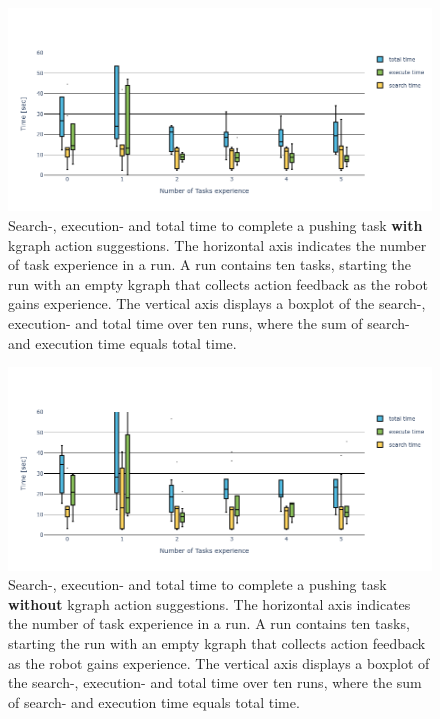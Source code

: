 \begin{figure}[H]
    \centering
    \includegraphics[width=\textwidth]{figures/results/random_push_time_kgraph}
    \caption{Search-, execution- and total time to complete a pushing task \textbf{with} \ac{kgraph} action suggestions. The horizontal axis indicates the number of task experience in a run. A run contains ten tasks, starting the run with an empty \ac{kgraph} that collects action feedback as the robot gains experience. The vertical axis displays a boxplot of the search-, execution- and total time over ten runs, where the sum of search- and execution time equals total time.}%
    \label{fig:random_push_time_kgraph}
\end{figure}

\begin{figure}[H]
    \centering
    \includegraphics[width=\textwidth]{figures/results/random_push_time_no_kgraph}
    \caption{Search-, execution- and total time to complete a pushing task \textbf{without} \ac{kgraph} action suggestions. The horizontal axis indicates the number of task experience in a run. A run contains ten tasks, starting the run with an empty \ac{kgraph} that collects action feedback as the robot gains experience. The vertical axis displays a boxplot of the search-, execution- and total time over ten runs, where the sum of search- and execution time equals total time.}%
    \label{fig:random_push_time_no_kgraph}
\end{figure}


